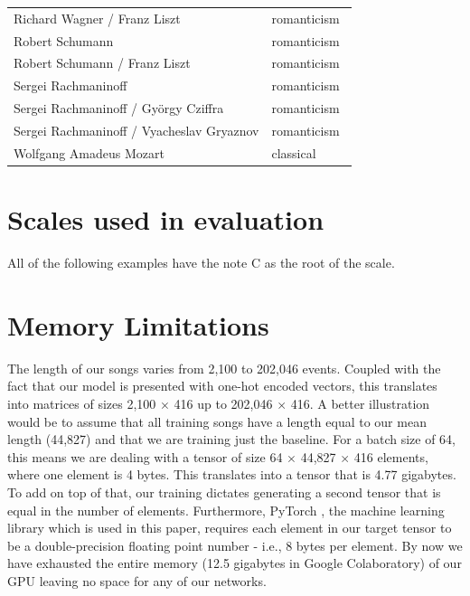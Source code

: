 \documentclass[a4paper]{book}
\begin{document}
\begin{center}
\begin{supertabular}{p{0.75\linewidth}|p{0.25\linewidth}}
Richard Wagner / Franz Liszt & romanticism \\ 
Robert Schumann & romanticism \\ 
Robert Schumann / Franz Liszt & romanticism \\ 
Sergei Rachmaninoff & romanticism \\ 
Sergei Rachmaninoff / György Cziffra & romanticism \\ 
Sergei Rachmaninoff / Vyacheslav Gryaznov & romanticism \\ 
Wolfgang Amadeus Mozart & classical \\ 
\end{supertabular}
\end{center}

\chapter{Scales used in evaluation} \label{appendix:scales}

All of the following examples have the note C as the root of the scale.
\begin{figure}[ht]
    \centering
    \def\svgwidth{\linewidth}
    
\end{figure}

\begin{figure}[ht]
    \centering
    \def\svgwidth{\linewidth}
    
\end{figure}

\chapter{Memory Limitations} \label{appendix:memory}

The length of our songs varies from 2,100 to 202,046 events. Coupled with the fact that our model is presented with one-hot encoded vectors, this translates into matrices of sizes 2,100 $\times$ 416 up to 202,046 $\times$ 416. A better illustration would be to assume that all training songs have a length equal to our mean length (44,827) and that we are training just the baseline. For a batch size of 64, this means we are dealing with a tensor of size 64 $\times$ 44,827 $\times$ 416 elements, where one element is 4 bytes. This translates into a tensor that is 4.77 gigabytes. To add on top of that, our training dictates generating a second tensor that is equal in the number of elements. Furthermore, PyTorch \parencite{paszke_automatic_2017}, the machine learning library which is used in this paper, requires each element in our target tensor to be a double-precision floating point number - i.e., 8 bytes per element. By now we have exhausted the entire memory (12.5 gigabytes in Google Colaboratory) of our GPU leaving no space for any of our networks.
\end{document}
